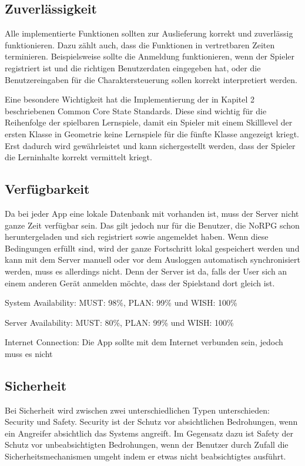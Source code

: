 {	\subsection{Zuverlässigkeit}
		Alle implementierte Funktionen sollten zur Auslieferung korrekt und zuverlässig funktionieren. Dazu zählt auch, dass die Funktionen in vertretbaren Zeiten terminieren. Beispielsweise sollte die Anmeldung funktionieren, wenn der Spieler registriert ist und die richtigen Benutzerdaten eingegeben hat, oder die Benutzereingaben für die Charaktersteuerung sollen korrekt interpretiert werden.
		
		Eine besondere Wichtigkeit hat die Implementierung der in Kapitel 2 beschriebenen Common Core State Standards. Diese sind wichtig für die Reihenfolge der spielbaren Lernspiele, damit ein Spieler mit einem Skilllevel der ersten Klasse in Geometrie keine Lernspiele für die fünfte Klasse angezeigt kriegt. Erst dadurch wird gewährleistet und kann sichergestellt werden, dass der Spieler die Lerninhalte korrekt vermittelt kriegt.
	
	\subsection{Verfügbarkeit}
		
		Da bei jeder App eine lokale Datenbank mit vorhanden ist, muss der Server nicht ganze Zeit verfügbar sein. Das gilt jedoch nur für die Benutzer, die NoRPG schon heruntergeladen und sich registriert sowie angemeldet haben. Wenn diese Bedingungen erfüllt sind, wird der ganze Fortschritt lokal gespeichert werden und kann mit dem Server manuell oder vor dem Ausloggen automatisch synchronisiert werden, muss es allerdings nicht. Denn der Server ist da, falls der User sich an einem anderen Gerät anmelden möchte, dass der Spielstand dort gleich ist. 
		
		System Availability: MUST: 98\%, PLAN: 99\% und WISH: 100\%
		
		Server Availability: MUST: 80\%, PLAN: 99\% und WISH: 100\%
		
		Internet Connection: Die App sollte mit dem Internet verbunden sein, jedoch muss es nicht
		
	\subsection{Sicherheit}
		Bei Sicherheit wird zwischen zwei unterschiedlichen Typen unterschieden: Security und Safety. Security ist der Schutz vor absichtlichen Bedrohungen, wenn ein Angreifer absichtlich das Systems angreift. Im Gegensatz dazu ist Safety der Schutz vor unbeabsichtigten Bedrohungen, wenn der Benutzer durch Zufall die Sicherheitsmechanismen umgeht indem er etwas nicht beabsichtigtes ausführt.
		
}
